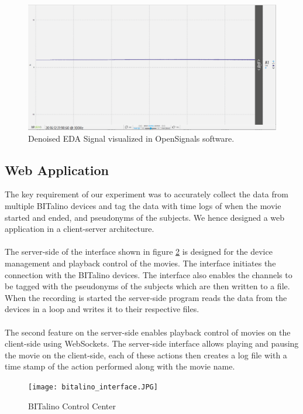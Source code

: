 \begin{figure}
\centering
\includegraphics[width=130mm]{Figures/eda_nonnoisy.PNG}
\caption{Denoised EDA Signal visualized in OpenSignals software.}
\label{fig:eda_nonnoisy}
\end{figure}

\subsection{Web Application}
\label{sec:custom_int}
The key requirement of our experiment was to accurately collect the data from multiple BITalino devices and tag the data with time logs of when the movie started and ended, and pseudonyms of the subjects. We hence designed a web application in a client-server architecture.
\paragraph{}
The server-side of the interface shown in figure \ref{fig:bitalino_cc} is designed for the device management and playback control of the movies. The interface initiates the connection with the BITalino devices. The interface also enables the channels to be tagged with the pseudonyms of the subjects which are then written to a file. When the recording is started the server-side program reads the data from the devices in a loop and writes it to their respective files.
\paragraph{}
The second feature on the server-side enables playback control of movies on the client-side using WebSockets. The server-side interface allows playing and pausing the movie on the client-side, each of these actions then creates a log file with a time stamp of the action performed along with the movie name.
\begin{figure}
\centering
\texttt{[image: bitalino\_interface.JPG]}
\caption{BITalino Control Center}
\label{fig:bitalino_cc}
\end{figure}

